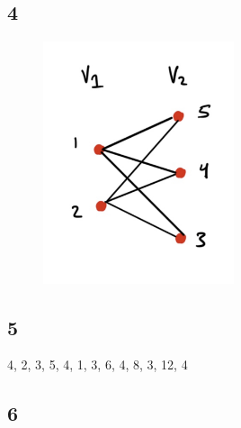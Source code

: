 \documentclass[14pt]{extarticle}
\begin{document}
\subsection*{4}
\begin{figure}[H]
\centering
\includegraphics[width=0.5\textwidth]{bitartite.png}
\end{figure}

\subsection*{5}
4, 2, 3, 5, 4, 1, 3, 6, 4, 8, 3, 12, 4



\subsection*{6}
\end{document}
